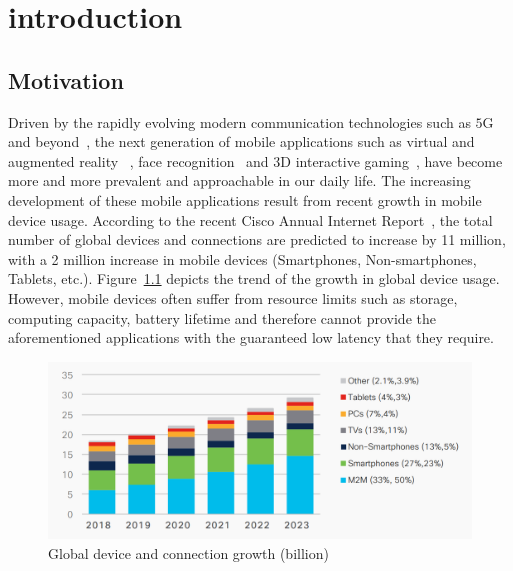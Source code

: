 \chapter{\textbf{introduction}}



\section{Motivation}

Driven by the rapidly evolving modern communication technologies such as $5$G and beyond~\cite{6G_beyond}, 
the next generation of mobile applications such as virtual and augmented reality ~\cite{CloudTrans_2020}, face recognition~\cite{soyata2012cloud} and 3D interactive gaming~\cite{chen2019framework}, have become more and more prevalent and approachable in our daily life. 
The increasing development of these mobile applications result from recent growth in mobile device usage. According to the recent Cisco Annual Internet Report~\cite{forecast2019cisco}, the total number of global devices and connections are predicted to increase by  11 million, with a 2 million increase in mobile devices (Smartphones, Non-smartphones, Tablets, etc.). Figure~\ref{fig:device_growth} depicts the trend of the growth in global device usage. However, mobile devices often suffer from resource limits such as storage, computing capacity, battery lifetime and therefore cannot provide the aforementioned applications with the guaranteed low latency that they require.
\begin{figure}
	\centering
	\includegraphics[width=.9\textwidth]{figs/devices growth.PNG}
		\vspace{\baselineskip}
	\caption{Global device and connection growth (billion)~\cite{forecast2019cisco}}
	\label{fig:device_growth}
\end{figure}


